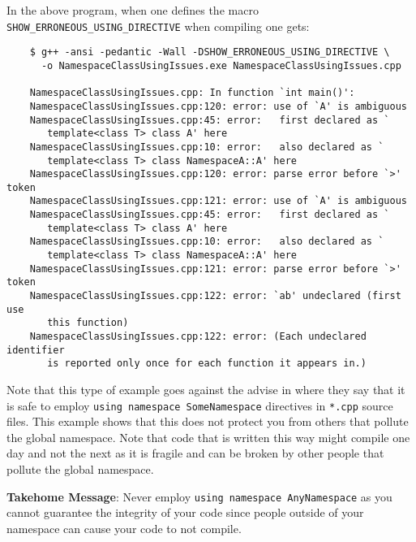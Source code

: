 \begin{enumerate}
In the above program, when one defines the macro
{}\texttt{SHOW\-\_ERRONEOUS\-\_USING\-\_DIRECTIVE} when compiling one gets:

{\small\begin{verbatim}
    $ g++ -ansi -pedantic -Wall -DSHOW_ERRONEOUS_USING_DIRECTIVE \
      -o NamespaceClassUsingIssues.exe NamespaceClassUsingIssues.cpp 

    NamespaceClassUsingIssues.cpp: In function `int main()':
    NamespaceClassUsingIssues.cpp:120: error: use of `A' is ambiguous
    NamespaceClassUsingIssues.cpp:45: error:   first declared as `
       template<class T> class A' here
    NamespaceClassUsingIssues.cpp:10: error:   also declared as `
       template<class T> class NamespaceA::A' here
    NamespaceClassUsingIssues.cpp:120: error: parse error before `>' token
    NamespaceClassUsingIssues.cpp:121: error: use of `A' is ambiguous
    NamespaceClassUsingIssues.cpp:45: error:   first declared as `
       template<class T> class A' here
    NamespaceClassUsingIssues.cpp:10: error:   also declared as `
       template<class T> class NamespaceA::A' here
    NamespaceClassUsingIssues.cpp:121: error: parse error before `>' token
    NamespaceClassUsingIssues.cpp:122: error: `ab' undeclared (first use 
       this function)
    NamespaceClassUsingIssues.cpp:122: error: (Each undeclared identifier 
       is reported only once for each function it appears in.)
\end{verbatim}}

Note that this type of example goes against the advise in {}\cite[Item
59]{C++CodingStandards05} where they say that it is safe to employ
{}\texttt{using namespace SomeNamespace} directives in {}\texttt{*.cpp} source
files.  This example shows that this does not protect you from others that
pollute the global namespace.  Note that code that is written this way might
compile one day and not the next as it is fragile and can be broken by other
people that pollute the global namespace.

{}\textbf{Takehome Message}: Never employ {}\texttt{using namespace
AnyNamespace} as you cannot guarantee the integrity of your code since people
outside of your namespace can cause your code to not compile.

\end{enumerate}
